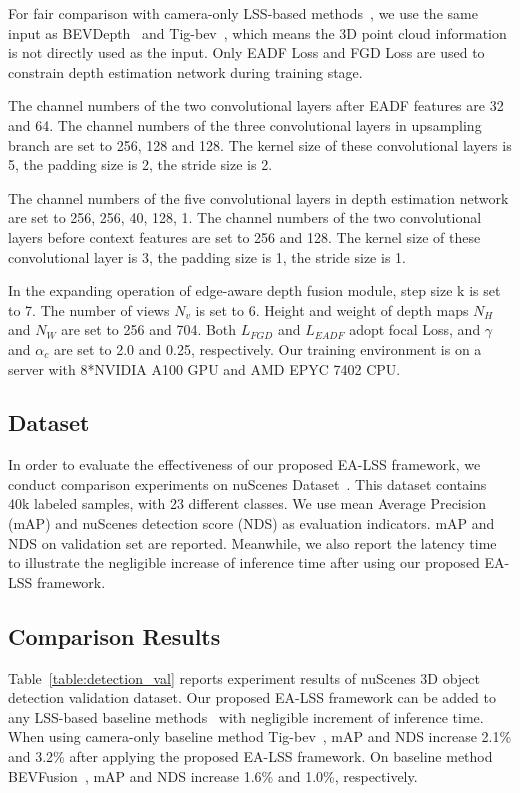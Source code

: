 \documentclass[letterpaper]{article} \usepackage[submission]{aaai24}  \usepackage{times}  \usepackage{helvet}  \usepackage{courier}  \usepackage[hyphens]{url}  \usepackage{graphicx} \urlstyle{rm} \def\UrlFont{\rm}  \usepackage{natbib}  \usepackage{caption} \frenchspacing  \setlength{\pdfpagewidth}{8.5in} \setlength{\pdfpageheight}{11in} \usepackage{algorithm}
\begin{document}
For fair comparison with camera-only LSS-based methods~\cite{li2022bevdepth,huang2022tigbev}, we use the same input as BEVDepth~\cite{li2022bevdepth} and Tig-bev~\cite{huang2022tigbev}, which means the 3D point cloud information is not directly used as the input. Only EADF Loss and FGD Loss are used to constrain depth estimation network during training stage.



The channel numbers of the two convolutional layers after EADF features are 32 and 64. The channel numbers of the three convolutional layers in upsampling branch are set to 256, 128 and 128. The kernel size of these convolutional layers is 5, the padding size is 2, the stride size is 2.

The channel numbers of the five convolutional layers in depth estimation network are set to 256, 256, 40, 128, 1. The channel numbers of the two convolutional layers before context features are set to 256 and 128. The kernel size of these convolutional layer is 3, the padding size is 1, the stride size is 1.

In the expanding operation of edge-aware depth fusion module, step size k is set to 7. The number of views $N_v$ is set to 6. Height and weight of depth maps $N_H$ and $N_W$ are set to 256 and 704.
Both $L_{FGD}$ and $L_{EADF}$ adopt focal Loss, and $\gamma$ and ${\alpha}_{c}$ are set to 2.0 and 0.25, respectively. Our training environment is on a server with 8*NVIDIA A100 GPU and AMD EPYC 7402 CPU.



\subsection{Dataset}
In order to evaluate the effectiveness of our proposed EA-LSS framework, we conduct comparison experiments on nuScenes Dataset~\cite{caesar2020nuScenes}. This dataset contains 40k labeled samples, with 23 different classes. We use mean Average Precision (mAP) and nuScenes detection score (NDS) as evaluation indicators. 
mAP and NDS on validation set are reported. Meanwhile, we also report the latency time to illustrate the negligible increase of inference time after using our proposed EA-LSS framework. 

\subsection{Comparison Results}


Table~\ref{table:detection_val} reports experiment results of nuScenes 3D object detection validation dataset. Our proposed EA-LSS framework can be added to any LSS-based baseline methods~\cite{li2022bevdepth,liu2022bevfusion, liang2022bevfusion,huang2022tigbev} with negligible increment of inference time. When using camera-only baseline method Tig-bev~\cite{huang2022tigbev}, mAP and NDS increase 2.1\% and 3.2\% after applying the proposed EA-LSS framework. 
On baseline method BEVFusion~\cite{liang2022bevfusion}, mAP and NDS increase 1.6\% and 1.0\%, respectively. 
\end{document}
